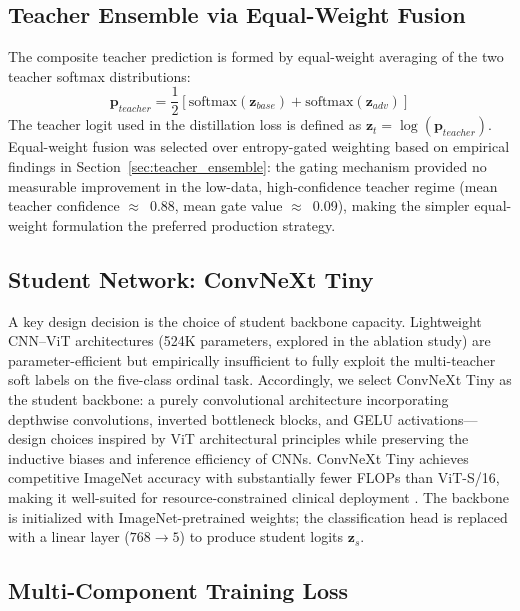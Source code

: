 \documentclass[a4paper,fleqn]{cas-dc}
\begin{document}
\subsection{Teacher Ensemble via Equal-Weight Fusion}
\label{sec:ensemble}

The composite teacher prediction is formed by equal-weight averaging of the two teacher softmax distributions:
\begin{equation}
  \mathbf{p}_{teacher} = \frac{1}{2}\!\left[\text{softmax}(\mathbf{z}_{base}) + \text{softmax}(\mathbf{z}_{adv})\right]
\end{equation}
The teacher logit used in the distillation loss is defined as $\mathbf{z}_t = \log(\mathbf{p}_{teacher})$. Equal-weight fusion was selected over entropy-gated weighting based on empirical findings in Section~\ref{sec:teacher_ensemble}: the gating mechanism provided no measurable improvement in the low-data, high-confidence teacher regime (mean teacher confidence $\approx$~0.88, mean gate value $\approx$~0.09), making the simpler equal-weight formulation the preferred production strategy.

\subsection{Student Network: ConvNeXt Tiny}

A key design decision is the choice of student backbone capacity. Lightweight CNN--ViT architectures (524K parameters, explored in the ablation study) are parameter-efficient but empirically insufficient to fully exploit the multi-teacher soft labels on the five-class ordinal task. Accordingly, we select ConvNeXt Tiny \cite{liu2022} as the student backbone: a purely convolutional architecture incorporating depthwise convolutions, inverted bottleneck blocks, and GELU activations---design choices inspired by ViT architectural principles while preserving the inductive biases and inference efficiency of CNNs. ConvNeXt Tiny achieves competitive ImageNet accuracy with substantially fewer FLOPs than ViT-S/16, making it well-suited for resource-constrained clinical deployment \cite{islam2023,yilmaz2025}. The backbone is initialized with ImageNet-pretrained weights; the classification head is replaced with a linear layer ($768{\to}5$) to produce student logits $\mathbf{z}_s$.

\subsection{Multi-Component Training Loss}
\end{document}

